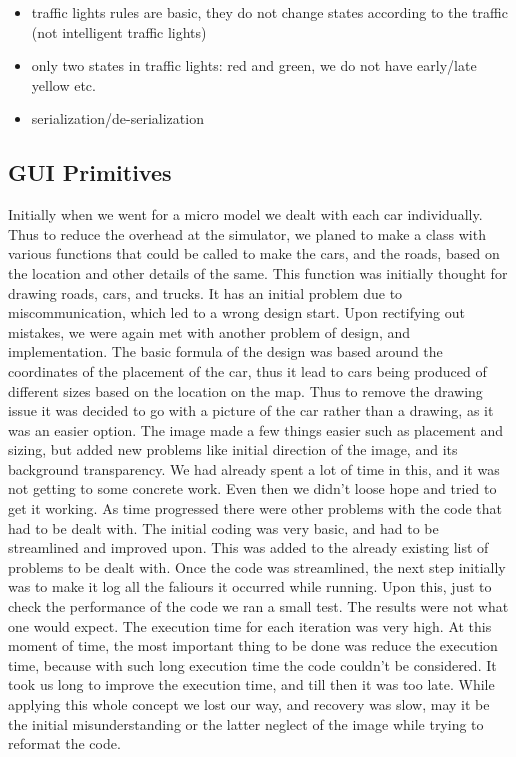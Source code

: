 \begin{itemize}
        \item traffic lights rules are basic, they do not change states according to the traffic (not intelligent traffic lights)
        \item only two states in traffic lights: red and green, we do not have early/late yellow etc.
\end{itemize}
     
\begin{itemize}
	\item serialization/de-serialization
\end{itemize}
\subsection{GUI Primitives}
Initially when we went for a micro  model we dealt with each car individually. Thus to reduce the overhead at the simulator, we planed to make a class with various functions that could be called to make the cars, and the roads, based on the location and other details of the same. This function was initially thought for drawing roads, cars, and trucks. It has an initial problem due to miscommunication, which led to a wrong design start. Upon rectifying out mistakes, we were again met with another problem of design, and implementation. The basic formula of the design was based around the coordinates of the placement of the car, thus it lead to cars being produced of different sizes based on the location on the map. Thus to remove the drawing issue it was decided to go with a picture of the car rather than a drawing, as it was an easier option. The image made a few things easier such as placement and sizing, but added new problems like initial direction of the image, and its background transparency. We had already spent a lot of time in this, and it was not getting to some concrete work. Even then we didn't loose hope and tried to get it working. As time progressed there were other problems with the code that had to be dealt with. The initial coding was very basic, and had to be streamlined and improved upon. This was added to the already existing list of problems to be dealt with. Once the code was streamlined, the next step initially was to make it log all the faliours it occurred while running. Upon this, just to check the performance of the code we ran a small test. The results were not what one would expect. The execution time for each iteration was very high. At this moment of time, the most important thing to be done was reduce the execution time, because with such long execution time the code couldn't be considered. It took us long to improve the execution time, and till then it was too late. While applying this whole concept we lost our way, and recovery was slow, may it be the initial misunderstanding or the latter neglect of the image while trying to reformat the code.


